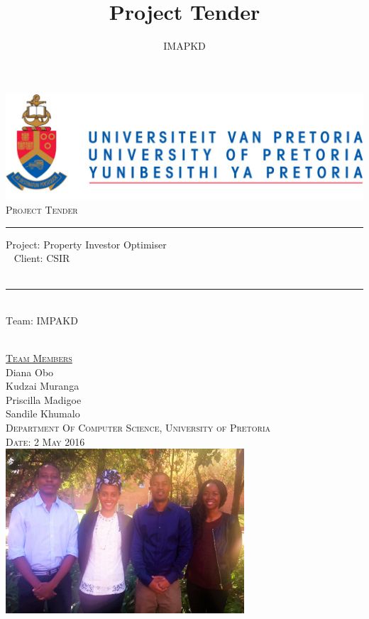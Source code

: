 \documentclass[a4paper,12pt]{article}
\author{IMAPKD}
\title{ Project Tender}
\begin{document}
\setlength{\parskip}{6pt}

\begin{titlepage}

\begin{center}
\includegraphics[width=1\textwidth]{./University_of_Pretoria_Logo.PNG}\\[0.4cm]    
\textsc{\Large Project Tender}\\[0.5cm]

\rule{15cm}{0.5pt}

{ \huge \textsc Project: Property Investor Optimiser }\\[0.4cm]\
{ \huge \textsc Client: CSIR  }\\[0.1cm]\
\rule{15cm}{0.4pt}
\\[0.4cm]
{ \huge \textsc Team: IMPAKD  }\\[0.2cm]\

\textsc{\Large\underline{Team Members}}\\[0.5cm]

{\Large Diana {Obo}} \\[0.3cm]

{\Large Kudzai {Muranga}} \\[0.3cm]

{\Large Priscilla {Madigoe}}\\[0.3cm]

{\Large Sandile {Khumalo}}\\[0.5cm]

\textsc{ Department Of Computer Science, University of Pretoria}\\[0.3cm]
\textsc{Date: 2 May 2016}\\[0.3cm]

\includegraphics[width=3.5in]{./IMAPKD.jpg}

\vfill
\end{center}
\end{titlepage}
\end{document}
